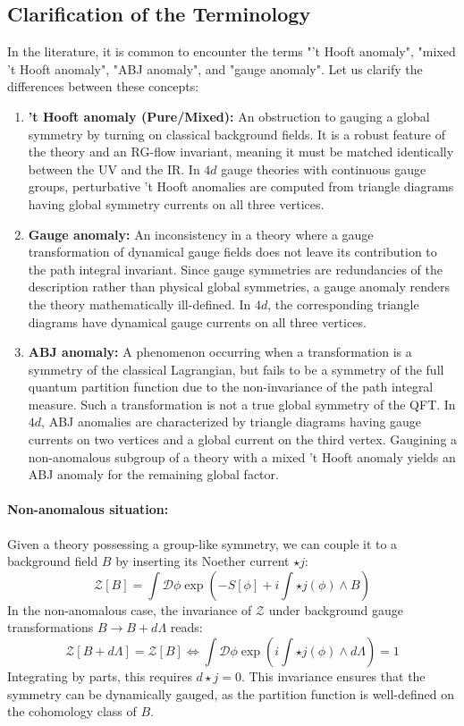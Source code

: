 \documentclass[aps,preprint,nofootinbib,preprintnumbers,eqsecnum,superscriptaddress]{revtex4}
\numberwithin{equation}{section}
\begin{document}
\subsection{Clarification of the Terminology}
In the literature, it is common to encounter the terms "'t Hooft anomaly", "mixed 't Hooft anomaly", "ABJ anomaly", and "gauge anomaly". Let us clarify the differences between these concepts:
\begin{enumerate}[\itshape i)]
    \item \textbf{'t Hooft anomaly (Pure/Mixed):} An obstruction to gauging a global symmetry by turning on classical background fields. It is a robust feature of the theory and an RG-flow invariant, meaning it must be matched identically between the UV and the IR. In $4d$ gauge theories with continuous gauge groups, perturbative 't Hooft anomalies are computed from triangle diagrams having global symmetry currents on all three vertices.
    \item \textbf{Gauge anomaly:} An inconsistency in a theory where a gauge transformation of dynamical gauge fields does not leave its contribution to the path integral invariant. Since gauge symmetries are redundancies of the description rather than physical global symmetries, a gauge anomaly renders the theory mathematically ill-defined. In $4d$, the corresponding triangle diagrams have dynamical gauge currents on all three vertices.
    \item \textbf{ABJ anomaly:} A phenomenon occurring when a transformation is a symmetry of the classical Lagrangian, but fails to be a symmetry of the full quantum partition function due to the non-invariance of the path integral measure. Such a transformation is not a true global symmetry of the QFT. In $4d$, ABJ anomalies are characterized by triangle diagrams having gauge currents on two vertices and a global current on the third vertex. Gaugining a non-anomalous subgroup of a theory with a mixed 't Hooft anomaly yields an ABJ anomaly for the remaining global factor.
\end{enumerate}

\paragraph*{Non-anomalous situation:} Given a theory possessing a group-like symmetry, we can couple it to a background field $B$ by inserting its Noether current $\star j$:
\begin{equation}
    \mathcal{Z}[B] = \int \mathcal{D}\phi \exp \left( -S[\phi] + i \int \star j(\phi) \wedge B \right)
\end{equation}
In the non-anomalous case, the invariance of $\mathcal{Z}$ under background gauge transformations $B \to B + d\Lambda$ reads:
\begin{equation}
    \mathcal{Z}[B + d\Lambda] = \mathcal{Z}[B] \iff \int \mathcal{D}\phi \exp \left( i \int \star j(\phi) \wedge d\Lambda \right) = 1
\end{equation}
Integrating by parts, this requires $d\star j=0$. This invariance ensures that the symmetry can be dynamically gauged, as the partition function is well-defined on the cohomology class of $B$.
\end{document}
